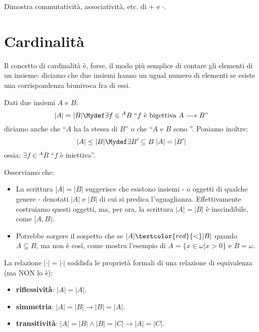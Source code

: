 \documentclass[11pt]{scrartcl}
\begin{document}
\begin{exercise}
	Dimostra commutatività, associatività, etc. di $+$ e $\cdot$.
\end{exercise}

\newpage
\section{Cardinalità}
Il concetto di cardinalità è, forse, il modo più semplice di contare gli elementi di un insieme: diciamo che due insiemi hanno un ugual numero di elementi se esiste
una corrispondenza biunivoca fra di essi.

\begin{definition}
	Dati due insiemi $A$ e $B$:
	\[ |A| = |B| \Mydef \exists f \in {}^A B \; \text{``$f$ è bigettiva $A \longrightarrow B$''}
		\]
	diciamo anche che ``$A$ ha la stessa  di $B$'' o che ``$A$ e $B$ sono ''. Poniamo inoltre:
	\[ |A| \leq |B| \Mydef \exists B' \subseteq B \; |A| = |B'| 
		\]
	ossia: $\exists f \in {}^A B$ ``$f$ è iniettiva''.
\end{definition}

\begin{note}
	Osserviamo che:
	\begin{itemize}
		\item La scrittura $|A| = |B|$ suggerisce che esistono insiemi - o oggetti di qualche genere - denotati $|A|$ e $|B|$ di cui si predica l'uguaglianza.
		Effettivamente costruiamo questi oggetti, ma, per ora, la scrittura $|A| = |B|$ è inscindibile, come $[A,B)$.
		\item Potrebbe sorgere il sospetto che se $|A|\textcolor{red}{<}|B|$ quando $A \subsetneq B$, ma non è così, come mostra l'esempio di $A = \{x \in \omega | x > 0\}$ e $B = \omega$.
	\end{itemize}
\end{note}

\begin{remark}
	La relazione $|\cdot| = |\cdot|$ soddisfa le proprietà formali di una relazione di equivalenza (ma NON lo è):
	\begin{itemize}
		\item \textbf{riflessività}: $|A| = |A|$.
		\item \textbf{simmetria}: $|A| = |B| \rightarrow |B| = |A|$.
		\item \textbf{transitività}: $|A| = |B| \land |B| = |C| \rightarrow |A| = |C|$.
	\end{itemize}
\end{remark}
\end{document}
